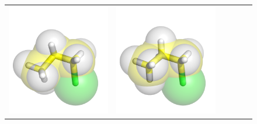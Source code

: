\documentclass{svmult}
\begin{document}
\begin{figure}
\centering
\begin{tabular}{cccccc}
\includegraphics[width=\tmpa]{fig/m003-000} &
\includegraphics[width=\tmpa]{fig/m003-001} &

\end{tabular}
\end{figure}
\end{document}
